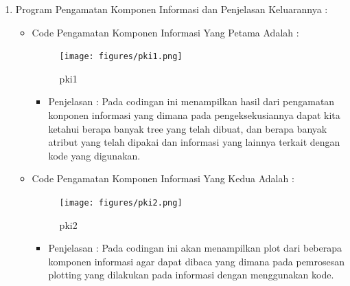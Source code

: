 \begin{enumerate}
\par
\par
\item Program Pengamatan Komponen Informasi dan Penjelasan Keluarannya :
\begin{itemize}
\item Code Pengamatan Komponen Informasi Yang Petama Adalah :
\par
\begin{figure}[ht]
\centering
\texttt{[image: figures/pki1.png]}
\caption{pki1}
\label{contoh}
\end{figure}
\par
\begin{itemize}
\item Penjelasan : Pada codingan ini menampilkan hasil dari pengamatan konponen informasi yang dimana pada pengeksekusiannya dapat kita ketahui berapa banyak tree yang telah dibuat, dan berapa banyak atribut yang telah dipakai dan informasi yang lainnya terkait dengan kode yang digunakan.
\par 
\par
\end{itemize}
\item Code Pengamatan Komponen Informasi Yang Kedua Adalah :
\par
\begin{figure}[ht]
\centering
\texttt{[image: figures/pki2.png]}
\caption{pki2}
\label{contoh}
\end{figure}
\par
\begin{itemize}
\item Penjelasan : Pada codingan ini akan menampilkan plot dari beberapa komponen informasi agar dapat dibaca yang dimana pada pemrosesan plotting yang dilakukan pada informasi dengan menggunakan kode.
\par
\par
\end{itemize}
\end{itemize}


\par
\par

\end{enumerate}
